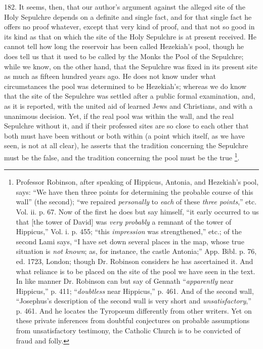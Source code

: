 182.
It seems, then, that our author's argument against the alleged site of
the Holy Sepulchre depends on a definite and single fact, and for that
single fact he offers no proof whatever, except that very kind of
proof, and that not so good in its kind as that on which the site of
the Holy Sepulchre is at present received. He cannot tell how long the
reservoir has been called Hezekiah's pool, though he does tell us that
it used to be called by the Monks the Pool of the Sepulchre; while we
know, on the other hand, that the Sepulchre was fixed in its present
site as much as fifteen hundred years ago. He does not know under what
circumstances the pool was determined to be Hezekiah's; whereas we do
know that the site of the Sepulchre was settled after a public formal
examination, and, as it is reported, with the united aid of learned
Jews and Christians, and with a unanimous decision. Yet, if the real
pool was within the wall, and the real Sepulchre without it, and if
their professed sites are so close to each other that both must
have been without or both within (a point which itself, as we have
seen, is not at all clear), he asserts that the tradition concerning
the Sepulchre must be the false, and the tradition concerning the pool
must be the true \footnote{Professor Robinson, after speaking of Hippicus, Antonia, and Hezekiah's
pool, says: ``We have then three points for determining the probable
course of this wall'' (the second); ``we repaired \emph{personally} to \emph{each}
of these \emph{three points},'' etc. Vol. ii. p. 67. Now of the first
he does but say himself, ``it early occurred to us that [the tower of
David] was \emph{very probably} a remnant of the tower of Hippicus,''
Vol. i. p. 455; ``this \emph{impression} was strengthened,'' etc.; of
the second Lami says, ``I have set down several places in the map,
whose true situation is \emph{not known}; as, for instance, the castle
Antonia;'' App. Bibl. p. 76, ed. 1723, London; though Dr. Robinson
considers he has ascertained it. And what reliance is to be placed on
the site of the pool we have seen in the text. In like manner Dr.
Robinson can but say of Gennath ``\emph{apparently} near Hippicus,'' p.
411; ``\emph{doubtless} near Hippicus,'' p. 461. And of the second wall,
``Josephus's description of the second wall is very short and \emph{unsatisfactory},''
p. 461. And he locates the Tyropœum differently from other writers.
Yet on these private inferences from doubtful conjectures on probable
assumptions from unsatisfactory testimony, the Catholic Church is to
be convicted of fraud and folly.}.

